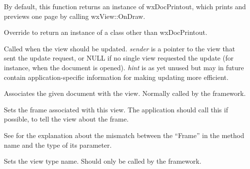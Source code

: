 By default, this function returns an instance of wxDocPrintout, which prints
and previews one page by calling wxView::OnDraw.

Override to return an instance of a class other than wxDocPrintout.



Called when the view should be updated. {\it sender} is a pointer to the view
that sent the update request, or NULL if no single view requested the update (for instance,
when the document is opened). {\it hint} is as yet unused but may in future contain
application-specific information for making updating more efficient.



Associates the given document with the view. Normally called by the
framework.



Sets the frame associated with this view. The application should call this
if possible, to tell the view about the frame.

See  for the explanation about the mismatch
between the ``Frame'' in the method name and the type of its parameter.



Sets the view type name. Should only be called by the framework.


